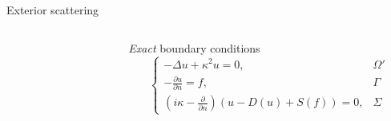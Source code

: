 \documentclass{beamer}
\begin{document}
\begin{frame}{Exterior scattering}
  \begin{columns}
    \begin{column}{0.35\textwidth}
    \begin{figure}[ht]
        \begin{center}
        \end{center}
      \end{figure}
        \end{column}
        \begin{column}{0.65\textwidth}
                \emph{Exact} boundary conditions
                 \[
                     \begin{cases}
                         -\Delta u + \kappa^2 u = 0, & \Omega' \\
                         -\frac{\partial u}{\partial n} = f, & \Gamma \\
                         (i \kappa- \tfrac{\partial}{\partial n})\left( u - D(u) + S(f) \right) = 0, & \Sigma
                     \end{cases}
                 \]
        \end{column}
    \end{columns}


\end{frame}
\end{document}
